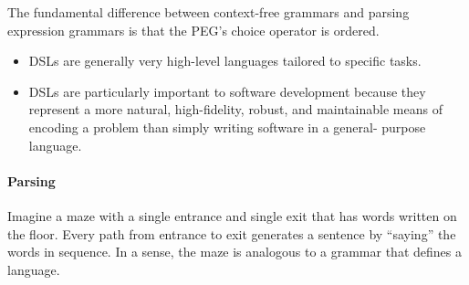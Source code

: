 \begin{comment}
	\item Chomsky’s generative system of grammars, from which the ubiqui- tous context-free grammars (CFGs) and regular expressions (REs) arise, was originally designed as a formal tool for modelling and analyzing natural (human) languages. Due to their elegance and expressive power, computer scientists adopted generative grammars for describing machine-oriented languages as well. The ability of a CFG to express ambiguous syntax is an important and powerful tool for natural languages. Unfortunately, this power gets in the way when we use CFGs for machine-oriented languages that are intended to be precise and unambiguous. Ambiguity in CFGs is difficult to avoid even when we want to, and it makes general CFG parsing an inherently super-linear-time problem [14, 23].
	\item A PEG may be viewed as a formal description of a top-down parser. Two closely related prior systems upon which this work is based were developed primarily for the purpose of studying top-down parsers [4, 5].
	\item PEGs have far more syntactic expressiveness than the LL(k) language class typically associated with top-down parsers, however, and can express all deterministic LR(k) languages and many others, including some non-context-free languages. Despite their considerable expressive power, all PEGs can be parsed in lin- ear time using a tabular or memoizing parser [8].
	\item he recognition-oriented nature of PEGs creates a natural affinity in terms of syntactic expressiveness and parsing efficiency.
\end{comment}

The fundamental difference between context-free grammars and parsing expression grammars is that the PEG's choice operator is ordered.

\begin{itemize}
	\item DSLs are generally very high-level languages tailored to specific tasks.
	\item DSLs are particularly important to software development because they represent a more natural, high-fidelity, robust, and maintainable means of encoding a problem than simply writing software in a general- purpose language.
\end{itemize}


\paragraph{Parsing} Imagine a maze with a single entrance and single exit that has words written on the floor. Every path from entrance to exit generates a sentence by “saying” the words in sequence. In a sense, the maze is analogous to a grammar that defines a language.

